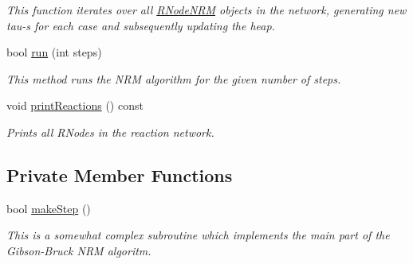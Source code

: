 \begin{DoxyCompactItemize}
\begin{DoxyCompactList}\small\item\em This function iterates over all \hyperlink{classchem_1_1RNodeNRM}{R\-Node\-N\-R\-M} objects in the network, generating new tau-\/s for each case and subsequently updating the heap. \end{DoxyCompactList}\item 
bool \hyperlink{classchem_1_1ChemNRMImpl_a8ccff6cf244e91b8057c323d17a5b48c}{run} (int steps)
\begin{DoxyCompactList}\small\item\em This method runs the N\-R\-M algorithm for the given number of steps. \end{DoxyCompactList}\item 
void \hyperlink{classchem_1_1ChemNRMImpl_a7898a5e226789a39b51f8fb56cc85c1e}{print\-Reactions} () const 
\begin{DoxyCompactList}\small\item\em Prints all R\-Nodes in the reaction network. \end{DoxyCompactList}\end{DoxyCompactItemize}
\subsection*{Private Member Functions}
\begin{DoxyCompactItemize}
\item 
bool \hyperlink{classchem_1_1ChemNRMImpl_a9f17d2b5953fd3ffc8b5337e78021ed2}{make\-Step} ()
\begin{DoxyCompactList}\small\item\em This is a somewhat complex subroutine which implements the main part of the Gibson-\/\-Bruck N\-R\-M algoritm. \end{DoxyCompactList}\end{DoxyCompactItemize}
